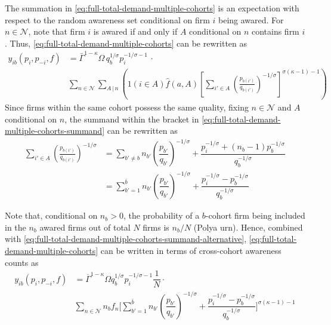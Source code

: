 \documentclass[12pt]{article}
\begin{document}
The summation in \cref{eq:full-total-demand-multiple-cohorts} is an expectation with respect to the random awareness set conditional on firm $i$ being awared. For $n \in \mathcal{N}$, note that firm $i$ is awared if and only if $A$ conditional on $n$ contains firm $i$. Thus, \cref{eq:full-total-demand-multiple-cohorts} can be rewritten as
\begin{align}
y_{ib}(p_i, p_{-i}, f)  &= \bar{\Gamma}^{1-\kappa}\Omega \, q_b^{1/\sigma}p_i^{-1/\sigma - 1}\, \cdot \\ 
& \sum_{n \in \mathcal{N} }  \sum_{{A}\,|\,n}\left( 1( i \in A ) \hat{f}(a,A)\left[\sum_{i'\in A}\left( \frac{p_{b(i')}}{q_{b(i')}}\right)^{-1/\sigma}\right]^{\sigma (\kappa - 1)-1}\right)\label{eq:full-total-demand-multiple-cohorts-summand}
\end{align}
Since firms within the same cohort possess the same quality, fixing $n \in \mathcal{N}$ and $A$ conditional on $n$, the summand within the bracket in \cref{eq:full-total-demand-multiple-cohorts-summand} can be rewritten as 
\begin{align}
\sum_{i'\in A}\left( \frac{p_{b(i')}}{q_{b(i')}}\right)^{-1/\sigma} &= \sum_{b' \neq b } n_{b'} \left( \dfrac{p_{b'}}{q_{b'}}  \right)^{-1/\sigma} +   
\dfrac{p_i^{-1/\sigma} + (n_b-1) p^{-1/\sigma}_{b} }{ q_b^{-1/\sigma }} \\
&= \sum_{b' =1 }^{\bar{b}} n_{b'} \left( \dfrac{p_{b'}}{q_{b'}}  \right)^{-1/\sigma} +   
\dfrac{p_i^{-1/\sigma}   - p^{-1/\sigma}_{b} }{{ q_b^{-1/\sigma }}} \label{eq:full-total-demand-multiple-cohorts-summand-alternative}
\end{align}


Note that, conditional on $n_b > 0$, the probability of a $b$-cohort firm being included in the $n_b$ awared firms out of total $N$ firms is $n_b /N$ (Polya urn). Hence, combined with \cref{eq:full-total-demand-multiple-cohorts-summand-alternative},  \cref{eq:full-total-demand-multiple-cohorts} can be written in terms of cross-cohort awareness counts as
\begin{align}
y_{ib}(p_i, p_{-i}, f) 
&=  \overline{\Gamma}^{1 - \kappa} \Omega q_b^{1/\sigma} p_i^{-1/\sigma-1} \dfrac{1}{N} \cdot 
\label{eq:full-total-demand-multiple-cohorts-alternative-first} \\ 
&\sum_{ n \in \mathcal{N} } n_b f_n \Bigg[ \sum_{b' =1 }^{\bar{b}} n_{b'} \left( \dfrac{p_{b'}}{q_{b'}}  \right)^{-1/\sigma} +   
\dfrac{p_i^{-1/\sigma}   - p^{-1/\sigma}_{b}}{{ q_b^{-1/\sigma }}}  \Bigg]^{\sigma(\kappa-1) -1}
\label{eq:full-total-demand-multiple-cohorts-alternative-second}
\end{align}
\end{document}
